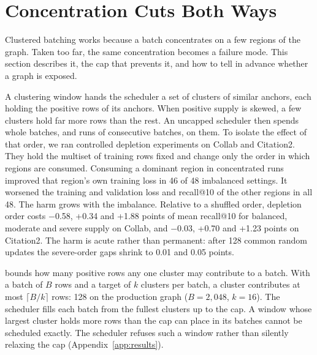\section{Concentration Cuts Both Ways}
\label{sec:capping}

Clustered batching works because a batch concentrates on a few regions of the graph. Taken too far, the same
concentration becomes a failure mode. This section describes it, the cap that prevents it, and how to tell in advance
whether a graph is exposed.

 A clustering window hands the scheduler a set of clusters of similar anchors, each holding
the positive rows of its anchors. When positive supply is skewed, a few clusters hold far more rows than the rest. An
uncapped scheduler then spends whole batches, and runs of consecutive batches, on them. To isolate the effect of that
order, we ran controlled depletion experiments on Collab and Citation2. They hold the multiset of training rows fixed
and change only the order in which regions are consumed. Consuming a dominant region in concentrated runs improved that
region's own training loss in 46 of 48 imbalanced settings. It worsened the training and validation loss and
recall@10 of the other regions in all 48. The harm grows with the imbalance. Relative to a shuffled order, depletion
order costs $-$0.58, +0.34 and +1.88 points of mean recall@10 for balanced, moderate and severe supply on Collab, and
$-$0.03, +0.70 and +1.23 points on Citation2. The harm is acute rather than permanent: after 128 common random updates
the severe-order gaps shrink to 0.01 and 0.05 points.

 \rowcap{} bounds how many positive rows any one cluster may contribute to a batch. With a
batch of $B$ rows and a target of $k$ clusters per batch, a cluster contributes at most $\lceil B/k \rceil$ rows: 128
on the production graph ($B = 2{,}048$, $k = 16$). The scheduler fills each batch from the fullest clusters up to the
cap. A window whose largest cluster holds more rows than the cap can place in its batches cannot be scheduled exactly.
The scheduler refuses such a window rather than silently relaxing the cap (Appendix~\ref{app:results}).

